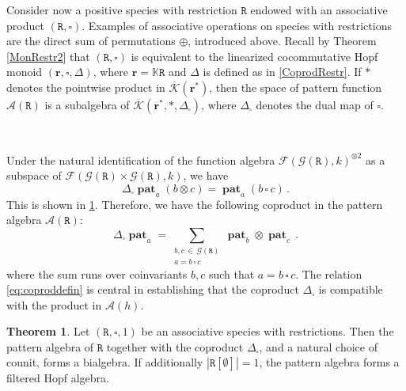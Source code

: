 \documentclass[12pt, reqno]{amsart}
\theoremstyle{definition}
\newtheorem{thm}{Theorem}[section]
\DeclareMathOperator{\pat}{\mathbf{pat}}
\newcommand{\prR}{\mathtt{R}}
\newcommand{\trr}{\mathbf{r}}
\newcommand{\Kc}{\mathcal{K}}
\newcommand{\Kcb}{\overline{\Kc}}
\newcommand{\sq}{{{\scriptstyle{\square}}}}
\begin{document}

Consider now a positive species with restriction $\prR$ endowed with an associative product $(\prR, \sq)$. Examples of associative operations on species with restrictions are the direct sum of permutations $\oplus$, introduced above. Recall by Theorem \eqref{MonRestr2} that 
$(\prR, \sq)$ is equivalent to the linearized cocommutative Hopf monoid $(\trr, \sq, \Delta)$, where $\trr=\mathbb{K}\prR$ and $\Delta$ is defined as in \eqref{CoprodRestr}. If $*$ denotes the pointwise product in $\Kcb(\trr^*)$, then the space of pattern function $\mathcal{A}(\prR)$ is a subalgebra of $\Kcb(\trr^*, *, \Delta_{\sq})$, where $\Delta_{\sq}$ denotes the dual map of $\sq$.

\

Under the natural identification of the function algebra $\mathcal{F}(\mathcal G (\prR), k)^{\otimes 2} $ as a subspace of $\mathcal{F}(\mathcal G (\prR) \times \mathcal G (\prR), k) $, we have
\begin{equation}\label{eq:coproddefin}
 \Delta_{\sq} \pat_a (b \otimes  c) =  \pat_a (b \,\sq\, c) \, .
\end{equation}
This is shown in \cref{thm:conHopfalgebra}. Therefore, we have the following coproduct in the pattern algebra $\mathcal A (\prR)$:
\begin{equation}\label{eq:coprodformula}
\Delta_{\sq} \pat_ a = \sum_{\substack{ b, c \, \in \, \mathcal G (\prR) \\ a = b \, \sq \, c}} \pat_b \otimes \pat_c \, .
\end{equation}
where the sum runs over coinvariants $b, c$ such that $a = b \,\sq \,c$. 
The relation \eqref{eq:coproddefin} is central in establishing that the coproduct $\Delta_{\sq} $ is compatible with the product in $\mathcal A (h)$.


\begin{thm}\label{thm:conHopfalgebra}
Let $(\prR, \sq, 1) $ be an associative species with restrictions.
Then the pattern algebra of $\prR$ together with the coproduct $\Delta_{\sq}$, and a natural choice of counit, forms a bialgebra.
If additionally $| \prR[\emptyset ] | = 1 $, the pattern algebra forms a filtered Hopf algebra.
\end{thm}

\end{document}
